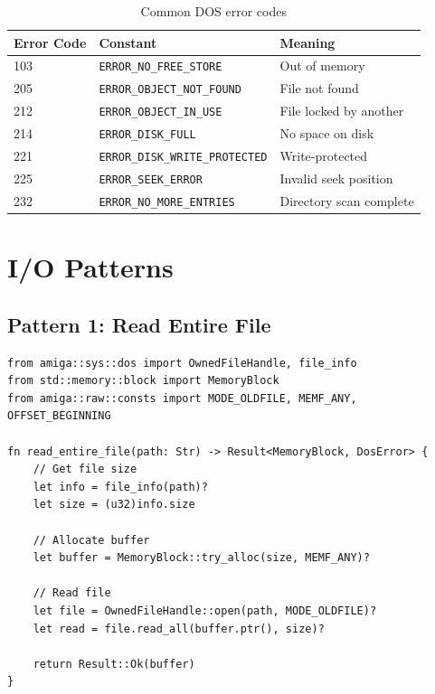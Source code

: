 \begin{table}[h]
\centering
\begin{tabular}{lll}
\textbf{Error Code} & \textbf{Constant} & \textbf{Meaning} \\
\hline
103 & \texttt{ERROR\_NO\_FREE\_STORE} & Out of memory \\
205 & \texttt{ERROR\_OBJECT\_NOT\_FOUND} & File not found \\
212 & \texttt{ERROR\_OBJECT\_IN\_USE} & File locked by another \\
214 & \texttt{ERROR\_DISK\_FULL} & No space on disk \\
221 & \texttt{ERROR\_DISK\_WRITE\_PROTECTED} & Write-protected \\
225 & \texttt{ERROR\_SEEK\_ERROR} & Invalid seek position \\
232 & \texttt{ERROR\_NO\_MORE\_ENTRIES} & Directory scan complete \\
\end{tabular}
\caption{Common DOS error codes}
\end{table}

\section{I/O Patterns}
\label{sec:io-patterns}

\subsection{Pattern 1: Read Entire File}

\begin{lstlisting}
from amiga::sys::dos import OwnedFileHandle, file_info
from std::memory::block import MemoryBlock
from amiga::raw::consts import MODE_OLDFILE, MEMF_ANY, OFFSET_BEGINNING

fn read_entire_file(path: Str) -> Result<MemoryBlock, DosError> {
    // Get file size
    let info = file_info(path)?
    let size = (u32)info.size

    // Allocate buffer
    let buffer = MemoryBlock::try_alloc(size, MEMF_ANY)?

    // Read file
    let file = OwnedFileHandle::open(path, MODE_OLDFILE)?
    let read = file.read_all(buffer.ptr(), size)?

    return Result::Ok(buffer)
}
\end{lstlisting}

